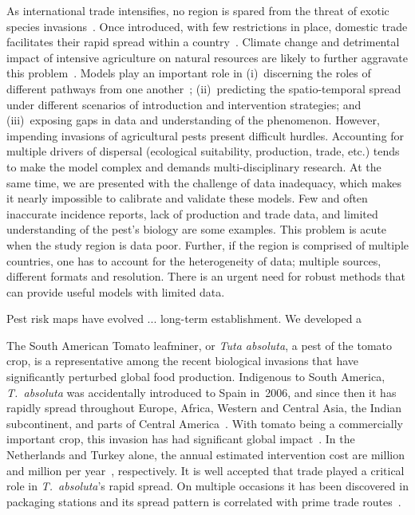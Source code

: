 \documentclass[11pt]{article}
\newcommand{\tuta}{\emph{T.~absoluta}}
\theoremstyle{definition}
\begin{document}
As international trade intensifies, no region is spared from the threat of
exotic species invasions~\cite{hulme2009trade}. Once introduced, with few
restrictions in place, domestic trade facilitates their rapid spread within
a country~\cite{}. Climate change and detrimental impact of intensive
agriculture on natural resources are likely to further aggravate this
problem~\cite{early2016global}.  Models play an important role in
(i)~discerning the roles of different pathways from one
another~\cite{13challenges}; (ii)~predicting the spatio-temporal spread
under different scenarios of introduction and intervention strategies; and
(iii)~exposing gaps in data and understanding of the phenomenon. However,
impending invasions of agricultural pests present difficult hurdles.
Accounting for multiple drivers of dispersal (ecological suitability,
production, trade, etc.) tends to make the model complex and demands
multi-disciplinary research. At the same time, we are presented with the
challenge of data inadequacy, which makes it nearly impossible to calibrate
and validate these models. Few and often inaccurate incidence reports, lack
of production and trade data, and limited understanding of the pest's
biology are some examples. This problem is acute when the study region is
data poor. Further, if the region is comprised of multiple countries, one
has to account for the heterogeneity of data; multiple sources, different
formats and resolution. There is an urgent need for robust methods that can
provide useful models with limited data.

Pest risk maps have evolved ... long-term establishment. 
 We developed a 


The South American Tomato leafminer, or \emph{Tuta absoluta}, a pest of the
tomato crop, is a representative among the recent biological invasions that
have significantly perturbed global food production. Indigenous to South
America, \tuta{} was accidentally introduced to Spain in~2006, and since
then it has rapidly spread throughout Europe, Africa, Western and Central
Asia, the Indian subcontinent, and parts of Central
America~\cite{desneux2010biological,biondi2017}. With tomato being a
commercially important crop, this invasion has had significant global
impact~\cite{campos2017western}. In the Netherlands and Turkey alone, the
annual estimated intervention cost are  million and 
million per year~\cite{}, respectively. It is well accepted that trade
played a critical role in \tuta{}'s rapid spread. On multiple occasions it
has been discovered in packaging stations and its spread pattern is
correlated with prime trade routes~\cite{karadjova2013tuta}. 
\end{document}
